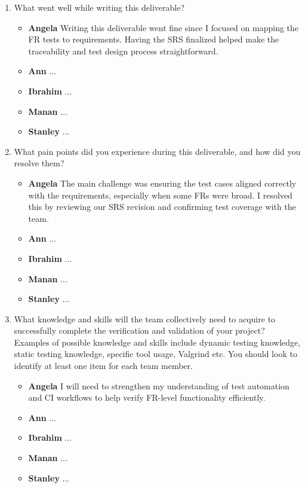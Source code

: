 \documentclass[12pt, titlepage]{article}
\begin{document}
\begin{enumerate}
  \item What went well while writing this deliverable? 
  \begin{itemize}
      \item \textbf{Angela} Writing this deliverable went fine since I focused on mapping the FR tests to requirements. Having the SRS finalized helped make the traceability and test design process straightforward.  
      \item \textbf{Ann} ...
      \item \textbf{Ibrahim} ...
      \item \textbf{Manan} ...
      \item \textbf{Stanley} ...
    \end{itemize}
  \item What pain points did you experience during this deliverable, and how
    did you resolve them?
  \begin{itemize}
      \item \textbf{Angela} The main challenge was ensuring the test cases aligned correctly with the requirements, especially when some FRs were broad. I resolved this by reviewing our SRS revision and confirming test coverage with the team.
      \item \textbf{Ann} ...
      \item \textbf{Ibrahim} ...
      \item \textbf{Manan} ...
      \item \textbf{Stanley} ...
    \end{itemize}

  \item What knowledge and skills will the team collectively need to acquire to
  successfully complete the verification and validation of your project?
  Examples of possible knowledge and skills include dynamic testing knowledge,
  static testing knowledge, specific tool usage, Valgrind etc.  You should look to
  identify at least one item for each team member.
  \begin{itemize}
      \item \textbf{Angela} I will need to strengthen my understanding of test automation and CI workflows to help verify FR-level functionality efficiently.
      \item \textbf{Ann} ...
      \item \textbf{Ibrahim} ...
      \item \textbf{Manan} ...
      \item \textbf{Stanley} ...
    \end{itemize}


\end{enumerate}
\end{document}

